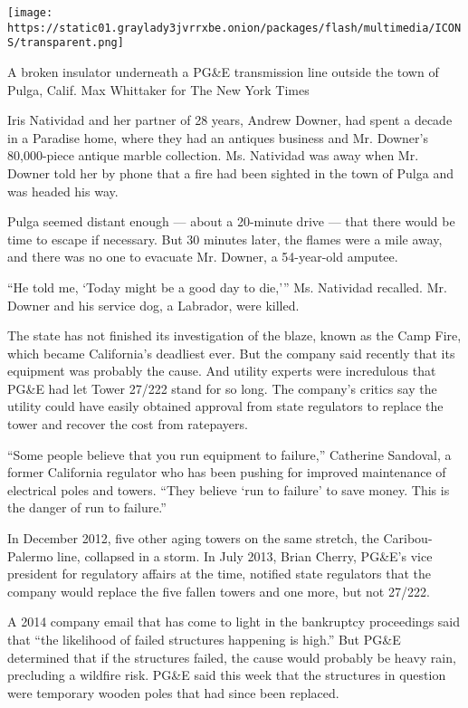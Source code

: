 \texttt{[image: https://static01.graylady3jvrrxbe.onion/packages/flash/multimedia/ICONS/transparent.png]}

A broken insulator underneath a PG\&E transmission line outside the town
of Pulga, Calif. Max Whittaker for The New York Times

Iris Natividad and her partner of 28 years, Andrew Downer, had spent a
decade in a Paradise home, where they had an antiques business and Mr.
Downer's 80,000-piece antique marble collection. Ms. Natividad was away
when Mr. Downer told her by phone that a fire had been sighted in the
town of Pulga and was headed his way.

Pulga seemed distant enough --- about a 20-minute drive --- that there
would be time to escape if necessary. But 30 minutes later, the flames
were a mile away, and there was no one to evacuate Mr. Downer, a
54-year-old amputee.

``He told me, `Today might be a good day to die,''' Ms. Natividad
recalled. Mr. Downer and his service dog, a Labrador, were killed.

The state has not finished its investigation of the blaze, known as the
Camp Fire, which became California's deadliest ever. But the company
said recently that its equipment was probably the cause. And utility
experts were incredulous that PG\&E had let Tower 27/222 stand for so
long. The company's critics say the utility could have easily obtained
approval from state regulators to replace the tower and recover the cost
from ratepayers.

``Some people believe that you run equipment to failure,'' Catherine
Sandoval, a former California regulator who has been pushing for
improved maintenance of electrical poles and towers. ``They believe `run
to failure' to save money. This is the danger of run to failure.''

In December 2012, five other aging towers on the same stretch, the
Caribou-Palermo line, collapsed in a storm. In July 2013, Brian Cherry,
PG\&E's vice president for regulatory affairs at the time, notified
state regulators that the company would replace the five fallen towers
and one more, but not 27/222.

A 2014 company email that has come to light in the bankruptcy
proceedings said that ``the likelihood of failed structures happening is
high.'' But PG\&E determined that if the structures failed, the cause
would probably be heavy rain, precluding a wildfire risk. PG\&E said
this week that the structures in question were temporary wooden poles
that had since been replaced.

